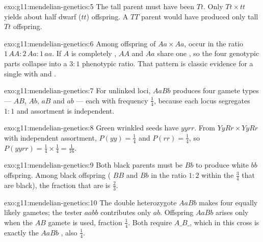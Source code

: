 \begin{solution}{exo:g11:mendelian-genetics:5}
The tall parent must have been  $Tt$. Only $Tt \times tt$ yields
about half dwarf ($tt$) offspring. A  $TT$ parent would have produced
only tall $Tt$ offspring.
\end{solution}

\begin{solution}{exo:g11:mendelian-genetics:6}
Among offspring of $Aa \times Aa$,  occur in the ratio
$1\,AA:2\,Aa:1\,aa$. If $A$ is completely , $AA$ and $Aa$ share one
, so the four genotypic parts collapse into a $3:1$ phenotypic ratio.
That pattern is classic evidence for a single  with  and .
\end{solution}

\begin{solution}{exo:g11:mendelian-genetics:7}
For unlinked loci, $AaBb$ produces four gamete types --- $AB$, $Ab$, $aB$ and
$ab$ --- each with frequency $\tfrac14$, because each locus segregates $1:1$
and assortment is independent.
\end{solution}

\begin{solution}{exo:g11:mendelian-genetics:8}
Green wrinkled seeds have  $yyrr$. From $YyRr \times YyRr$ with
independent assortment, $P(yy)=\tfrac14$ and $P(rr)=\tfrac14$, so
$P(yyrr)=\tfrac14\times\tfrac14=\tfrac1{16}$.
\end{solution}

\begin{solution}{exo:g11:mendelian-genetics:9}
Both black parents must be  $Bb$ to produce white $bb$ offspring.
Among black offspring ( $BB$ and $Bb$ in the ratio $1:2$ within the
$\tfrac34$ that are black), the fraction that are  is $\tfrac23$.
\end{solution}

\begin{solution}{exo:g11:mendelian-genetics:10}
The double heterozygote $AaBb$ makes four equally likely gametes; the tester
$aabb$ contributes only $ab$. Offspring $AaBb$ arises only when the $AB$ gamete
is used, fraction $\tfrac14$. Both   require $A\_B\_$, which
in this cross is exactly the $AaBb$ , also $\tfrac14$.
\end{solution}

